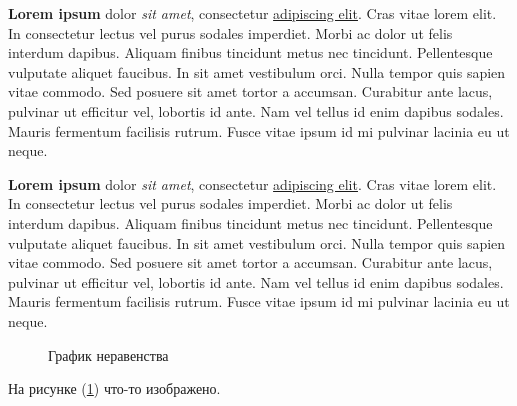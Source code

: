 \documentclass[14px, a4paper]{article}
\begin{document}
	\begin{minipage}{.4\linewidth}
		\textbf{Lorem ipsum} dolor \textit{sit amet}, consectetur \underline{adipiscing elit}. Cras vitae lorem elit. In consectetur lectus vel purus sodales imperdiet. Morbi ac dolor ut felis interdum dapibus. Aliquam finibus tincidunt metus nec tincidunt. Pellentesque vulputate aliquet faucibus. In sit amet vestibulum orci. Nulla tempor quis sapien vitae commodo. Sed posuere sit amet tortor a accumsan. Curabitur ante lacus, pulvinar ut efficitur vel, lobortis id ante. Nam vel tellus id enim dapibus sodales. Mauris fermentum facilisis rutrum. Fusce vitae ipsum id mi pulvinar lacinia eu ut neque.
	\end{minipage}
	\;\;
	\begin{minipage}{.4\linewidth}
		\textbf{Lorem ipsum} dolor \textit{sit amet}, consectetur \underline{adipiscing elit}. Cras vitae lorem elit. In consectetur lectus vel purus sodales imperdiet. Morbi ac dolor ut felis interdum dapibus. Aliquam finibus tincidunt metus nec tincidunt. Pellentesque vulputate aliquet faucibus. In sit amet vestibulum orci. Nulla tempor quis sapien vitae commodo. Sed posuere sit amet tortor a accumsan. Curabitur ante lacus, pulvinar ut efficitur vel, lobortis id ante. Nam vel tellus id enim dapibus sodales. Mauris fermentum facilisis rutrum. Fusce vitae ipsum id mi pulvinar lacinia eu ut neque.
	\end{minipage}

	\begin{figure}[h!]
		\caption{График неравенства}
		\label{fig:graph}
	\end{figure}

	На рисунке (\ref{fig:graph}) что-то изображено.
\end{document}
